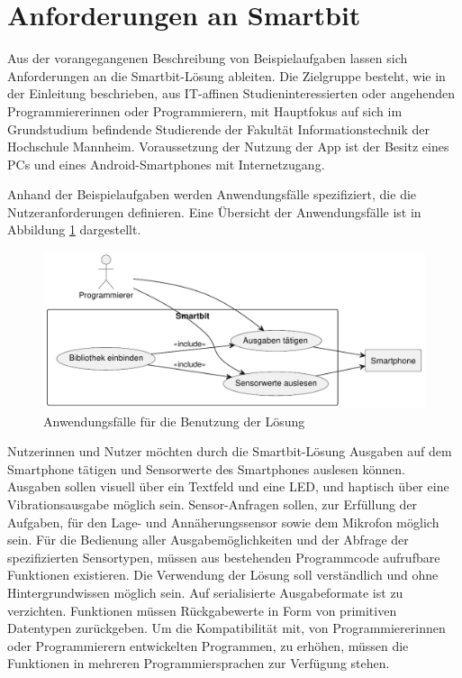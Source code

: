 \documentclass[11pt,a4paper]{report}
\begin{document}
\section{Anforderungen an Smartbit}\label{sec:anforderungen}
Aus der vorangegangenen Beschreibung von Beispielaufgaben lassen sich Anforderungen an die Smartbit-Lösung ableiten.
Die Zielgruppe besteht, wie in der Einleitung beschrieben, aus IT-affinen Studieninteressierten oder angehenden Programmiererinnen oder Programmierern, mit Hauptfokus auf sich im Grundstudium befindende Studierende der Fakultät Informationstechnik der Hochschule Mannheim.
Voraussetzung der Nutzung der App ist der Besitz eines PCs und eines Android-Smartphones  mit Internetzugang.

Anhand der Beispielaufgaben werden Anwendungsfälle spezifiziert, die die Nutzeranforderungen definieren.
Eine Übersicht der Anwendungsfälle ist in Abbildung \ref{fig:usecase} dargestellt.
\begin{figure}[htbp]
  \centering
  \includegraphics[width=.8\textwidth]{images/usecase_usage.pdf}
  \caption{Anwendungsfälle für die Benutzung der Lösung}
  \label{fig:usecase}
\end{figure}
Nutzerinnen und Nutzer möchten durch die Smartbit-Lösung Ausgaben auf dem Smartphone tätigen und Sensorwerte des Smartphones auslesen können.
Ausgaben sollen visuell über ein Textfeld und eine LED, und haptisch über eine Vibrationsausgabe möglich sein.
Sensor-Anfragen sollen, zur Erfüllung der Aufgaben, für den Lage- und Annäherungssensor sowie dem Mikrofon möglich sein.
Für die Bedienung aller Ausgabemöglichkeiten und der Abfrage der spezifizierten Sensortypen, müssen aus bestehenden Programmcode aufrufbare Funktionen existieren.
Die Verwendung der Lösung soll verständlich und ohne Hintergrundwissen möglich sein.
Auf serialisierte Ausgabeformate ist zu verzichten.
Funktionen müssen Rückgabewerte in Form von primitiven Datentypen zurückgeben.
Um die Kompatibilität mit, von Programmiererinnen oder Programmierern entwickelten Programmen, zu erhöhen, müssen die Funktionen in mehreren Programmiersprachen zur Verfügung stehen.
\end{document}
